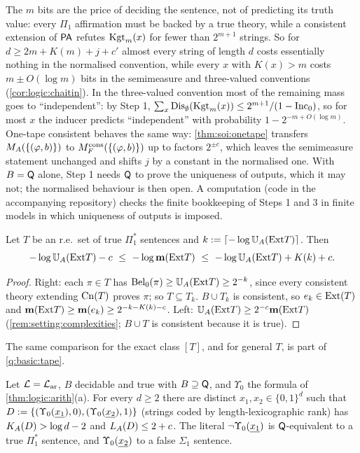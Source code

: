 The $m$ bits are the price of deciding the sentence, not of predicting its truth value: every $\Pi_1$ affirmation must be backed by a true theory, while a consistent extension of $\mathsf{PA}$ refutes $\mathrm{Kgt}_m(x)$ for fewer than $2^{m+1}$ strings. So for $d\ge2m+K(m)+j+c'$ almost every string of length $d$ costs essentially nothing in the normalised convention, while every $x$ with $K(x)>m$ costs $m\pm O(\log m)$ bits in the semimeasure and three-valued conventions (\cref{cor:logic:chaitin}). In the three-valued convention most of the remaining mass goes to ``independent'': by Step 1, $\sum_x\mathrm{Dis}_\emptyset(\mathrm{Kgt}_m(x))\le2^{m+1}/(1-\mathrm{Inc}_0)$, so for most $x$ the inducer predicts ``independent'' with probability $1-2^{-m+O(\log m)}$. One-tape consistent \SOIabbr behaves the same way: \cref{thm:soi:onetape} transfers $M_{A}(\{(\varphi,b)\})$ to $M_{F}^{\mathrm{cons}}(\{(\varphi,b)\})$ up to factors $2^{\pm c}$, which leaves the semimeasure statement unchanged and shifts $j$ by a constant in the normalised one. With $B=\mathsf{Q}$ alone, Step 1 needs $\mathsf{Q}$ to prove the uniqueness of outputs, which it may not; the normalised behaviour is then open. A computation (code in the accompanying repository) checks the finite bookkeeping of Steps 1 and 3 in finite models in which uniqueness of outputs is imposed.

\begin{proposition}\label{prop:logic:extension}
Let $T$ be an r.e.\ set of true $\Pi_1^*$ sentences and $k:=\lceil-\log\mathbb{U}_{A}(\mathrm{Ext} T)\rceil$. Then
\[
-\log\UA(\Exts T)-c\ \le\ -\log\mm(\Exts T)\ \le\ -\log\UA(\Exts T)+K(k)+c .
\]
\end{proposition}

\begin{proof}
Right: each $\pi\in T$ has $\mathrm{Bel}_0(\pi)\ge\mathbb{U}_{A}(\mathrm{Ext} T)\ge2^{-k}$, since every consistent theory extending $\mathrm{Cn}(T)$ proves $\pi$; so $T\subseteq T_k$. $B\cup T_k$ is consistent, so $e_k\in\mathrm{Ext}(T)$ and $\mathbf{m}(\mathrm{Ext} T)\ge\mathbf{m}(e_k)\ge2^{-k-K(k)-c}$. Left: $\mathbb{U}_{A}(\mathrm{Ext} T)\ge2^{-c}\mathbf{m}(\mathrm{Ext} T)$ (\cref{rem:setting:complexities}; $B\cup T$ is consistent because it is true).
\end{proof}

The same comparison for the exact class $[T]$, and for general $T$, is part of \cref{q:basic:tape}.

\begin{proposition}\label{prop:logic:falsesigma}
Let $\mathcal L=\mathcal{L}_{\mathrm{ar}}$, $B$ decidable and true with $B\supseteq\mathsf{Q}$, and $\Upsilon_0$ the formula of \cref{thm:logic:arith}(a). For every $d\ge2$ there are distinct $x_1,x_2\in\{0,1\}^d$ such that $D:=\{(\Upsilon_0(\underline{x_1}),0),(\Upsilon_0(\underline{x_2}),1)\}$ (strings coded by length-lexicographic rank) has $K_{A}(D)>\log d-2$ and $L_{A}(D)\le2+c$. The literal $\neg\Upsilon_0(\underline{x_1})$ is $\mathsf{Q}$-equivalent to a true $\Pi_1^*$ sentence, and $\Upsilon_0(\underline{x_2})$ to a false $\Sigma_1$ sentence.
\end{proposition}

